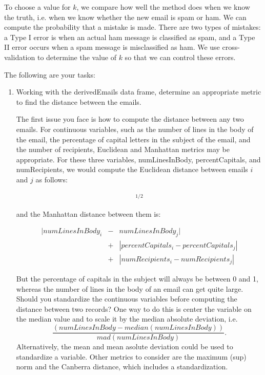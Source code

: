 \documentclass{article}
\begin{document}
To choose a value for $k$, we 
compare how well the method does when we know the truth,
i.e. when we know whether the new email is spam or ham.
We can compute the probability that a mistake is made.
There are two types of mistakes: a Type I error is when
an actual ham message is classified as spam, and a Type II
error occurs when a spam message is misclassified as ham.
We use cross-validation to determine the value of $k$ so that we
can control these errors. 

The following are your tasks:

\begin{enumerate}
\item Working with the derivedEmails data frame, determine an appropriate
metric to find the distance between the emails.

The first issue you face is how to compute the
distance between any two emails.
For continuous variables,
such as the number of lines in the
body of the email, the percentage of capital
letters in the subject of the email, and
the number of recipients,
Euclidean and Manhattan metrics may be appropriate.
For these three variables,
numLinesInBody, percentCapitals, and numRecipients,
we would compute the Euclidean distance between
emails $i$ and $j$ as follows:

\begin{eqnarray*}
 [(numLinesInBody_i &-& numLinesInBody_j)^2 \\
   &+& (percentCapitals_i - percentCapitals_j)^2\\
     &+& (numRecipients_i - numRecipients_j)^2 ]^{1/2} 
\end{eqnarray*}

and the Manhattan distance between them is:
 
\begin{eqnarray*}
  |numLinesInBody_i &-& numLinesInBody_j|\\
    &+& |percentCapitals_i - percentCapitals_j|\\
      &+& |numRecipients_i - numRecipients_j|
\end{eqnarray*}

But the percentage of capitals in the subject
will always be between 0 and 1,
whereas the number of lines in the body of an
email can get quite large.
Should you standardize the continuous variables before
computing the distance between two records?
One way to do this is center the variable on
the median value and to scale it by the median
absolute deviation, i.e.
$$
\frac{(numLinesInBody - median(numLinesInBody))}
{mad(numLinesInBody)} .$$
Alternatively, the mean and mean asolute deviation could
be used to standardize a variable.
Other metrics to consider are the maximum (sup) norm
and the Canberra distance, which includes a standardization.
 

\end{enumerate}
\end{document}
